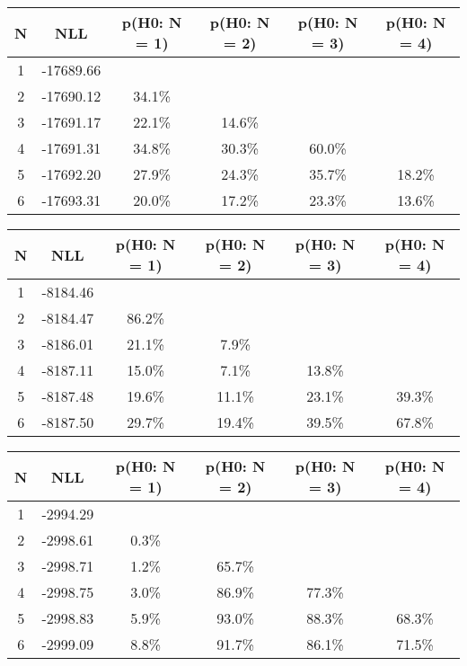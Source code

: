 \begin{table}[htb]
	\begin{center}
{\footnotesize\renewcommand{\arraystretch}{1.4}
		\begin{tabular}{cc||cccc}
			N & NLL & p(H0: N = 1) & p(H0: N = 2) & p(H0: N = 3) & p(H0: N = 4)\\ 
		\hline
1 & -17689.66 & & & & \\
2 & -17690.12 & 34.1\% & & & \\
3 & -17691.17 & 22.1\% & 14.6\% & & \\
4 & -17691.31 & 34.8\% & 30.3\% & 60.0\% & \\
5 & -17692.20 & 27.9\% & 24.3\% & 35.7\% & 18.2\% \\
6 & -17693.31 & 20.0\% & 17.2\% & 23.3\% & 13.6\% \\
	\end{tabular}
		\label{tab:lab}
	}
	\end{center}\end{table}

\begin{table}[htb]
	\begin{center}
{\footnotesize\renewcommand{\arraystretch}{1.4}
		\begin{tabular}{cc||cccc}
			N & NLL & p(H0: N = 1) & p(H0: N = 2) & p(H0: N = 3) & p(H0: N = 4)\\ 
		\hline
1 & -8184.46 & & & & \\
2 & -8184.47 & 86.2\% & & & \\
3 & -8186.01 & 21.1\% & 7.9\% & & \\
4 & -8187.11 & 15.0\% & 7.1\% & 13.8\% & \\
5 & -8187.48 & 19.6\% & 11.1\% & 23.1\% & 39.3\% \\
6 & -8187.50 & 29.7\% & 19.4\% & 39.5\% & 67.8\% \\
	\end{tabular}
		\label{tab:lab}
	}
	\end{center}\end{table}

\begin{table}[htb]
	\begin{center}
{\footnotesize\renewcommand{\arraystretch}{1.4}
		\begin{tabular}{cc||cccc}
			N & NLL & p(H0: N = 1) & p(H0: N = 2) & p(H0: N = 3) & p(H0: N = 4)\\ 
		\hline
1 & -2994.29 & & & & \\
2 & -2998.61 & 0.3\% & & & \\
3 & -2998.71 & 1.2\% & 65.7\% & & \\
4 & -2998.75 & 3.0\% & 86.9\% & 77.3\% & \\
5 & -2998.83 & 5.9\% & 93.0\% & 88.3\% & 68.3\% \\
6 & -2999.09 & 8.8\% & 91.7\% & 86.1\% & 71.5\% \\
	\end{tabular}
		\label{tab:lab}
	}
	\end{center}\end{table}

